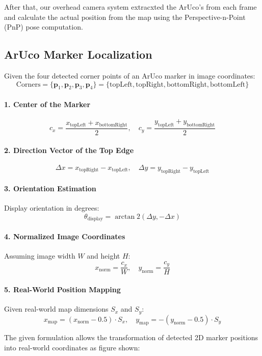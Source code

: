 After that, our overhead camera system extracxted the ArUco's from each frame and calculate the actual position from the map using the Perspective-n-Point (PnP) pose computation.

\subsection*{ArUco Marker Localization}

Given the four detected corner points of an ArUco marker in image coordinates:
\[
\text{Corners} = \{ \mathbf{p}_1, \mathbf{p}_2, \mathbf{p}_3, \mathbf{p}_4 \} = \{ \text{topLeft}, \text{topRight}, \text{bottomRight}, \text{bottomLeft} \}
\]

\paragraph*{1. Center of the Marker}
\[
c_x = \frac{x_{\text{topLeft}} + x_{\text{bottomRight}}}{2}, \quad
c_y = \frac{y_{\text{topLeft}} + y_{\text{bottomRight}}}{2}
\]

\paragraph*{2. Direction Vector of the Top Edge}
\[
\Delta x = x_{\text{topRight}} - x_{\text{topLeft}}, \quad
\Delta y = y_{\text{topRight}} - y_{\text{topLeft}}
\]

\paragraph*{3. Orientation Estimation}
Display orientation in degrees:
\[
\theta_{\text{display}} = \arctan2(\Delta y, -\Delta x)
\]

\paragraph*{4. Normalized Image Coordinates}
Assuming image width $W$ and height $H$:
\[
x_{\text{norm}} = \frac{c_x}{W}, \quad
y_{\text{norm}} = \frac{c_y}{H}
\]

\paragraph*{5. Real-World Position Mapping}
Given real-world map dimensions $S_x$ and $S_y$:
\[
x_{\text{map}} = (x_{\text{norm}} - 0.5) \cdot S_x, \quad
y_{\text{map}} = -(y_{\text{norm}} - 0.5) \cdot S_y
\]

The given formulation allows the transformation of detected 2D marker positions into real-world coordinates as figure shown:

